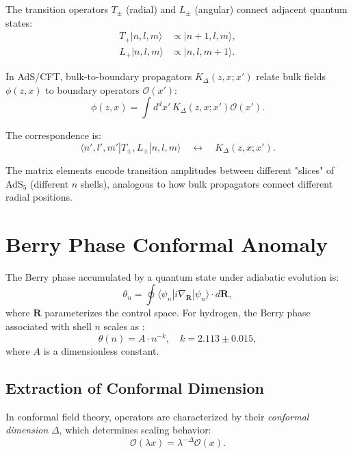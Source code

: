 \documentclass[aps,prd,twocolumn,superscriptaddress,floatfix]{revtex4-2}
\begin{document}
The transition operators $T_\pm$ (radial) and $L_\pm$ (angular) connect adjacent quantum states:
\begin{align}
T_+ |n,l,m\rangle &\propto |n+1,l,m\rangle, \\
L_+ |n,l,m\rangle &\propto |n,l,m+1\rangle.
\end{align}

In AdS/CFT, bulk-to-boundary propagators $K_\Delta(z, x; x')$ relate bulk fields $\phi(z, x)$ to boundary operators $\mathcal{O}(x')$:
\begin{equation}
\phi(z, x) = \int d^d x' \, K_\Delta(z, x; x') \mathcal{O}(x').
\end{equation}

The correspondence is:
\begin{equation}
\langle n', l', m' | T_\pm, L_\pm | n, l, m \rangle \quad \longleftrightarrow \quad K_\Delta(z, x; x').
\end{equation}

The matrix elements encode transition amplitudes between different "slices" of AdS$_5$ (different $n$ shells), analogous to how bulk propagators connect different radial positions.


\section{Berry Phase Conformal Anomaly}

The Berry phase \cite{berry1984} accumulated by a quantum state under adiabatic evolution is:
\begin{equation}
\theta_n = \oint \langle \psi_n | i\nabla_\mathbf{R} | \psi_n \rangle \cdot d\mathbf{R},
\end{equation}
where $\mathbf{R}$ parameterizes the control space. For hydrogen, the Berry phase associated with shell $n$ scales as \cite{companion_lattice}:
\begin{equation}
\theta(n) = A \cdot n^{-k}, \quad k = 2.113 \pm 0.015,
\label{eq:berry_scaling}
\end{equation}
where $A$ is a dimensionless constant.

\subsection{Extraction of Conformal Dimension}

In conformal field theory, operators are characterized by their \textit{conformal dimension} $\Delta$, which determines scaling behavior:
\begin{equation}
\mathcal{O}(\lambda x) = \lambda^{-\Delta} \mathcal{O}(x).
\end{equation}
\end{document}
